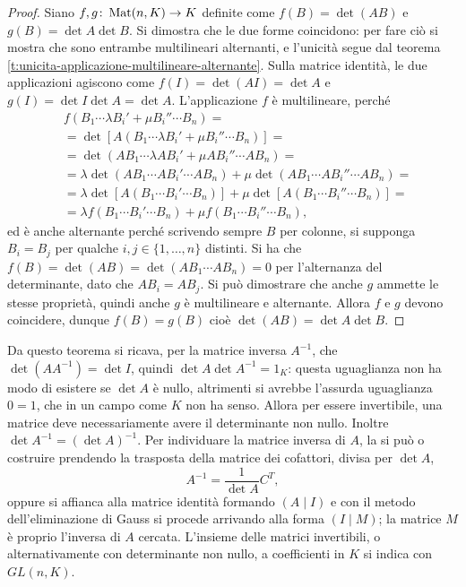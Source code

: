 \begin{proof}
	Siano $f,g\colon\operatorname{Mat}(n,K)\to K$ definite come $f(B)=\det(AB)$ e $g(B)=\det A\det B$.
	Si dimostra che le due forme coincidono: per fare ciò si mostra che sono entrambe multilineari alternanti, e l'unicità segue dal teorema \ref{t:unicita-applicazione-multilineare-alternante}.
	Sulla matrice identità, le due applicazioni agiscono come $f(I)=\det(AI)=\det A$ e $g(I)=\det I\det A=\det A$.
	L'applicazione $f$ è multilineare, perché
	\begin{align*}
		&f(B_1\cdots\lambda B_i'+\mu B_i''\cdots B_n)=\\
		&=\det[A(B_1\cdots\lambda B_i'+\mu B_i''\cdots B_n)]=\\
		&=\det(AB_1\cdots\lambda AB_i'+\mu AB_i''\cdots AB_n)=\\
		&=\lambda\det(AB_1\cdots AB_i'\cdots AB_n)+\mu\det(AB_1\cdots AB_i''\cdots AB_n)=\\
		&=\lambda\det[A(B_1\cdots B_i'\cdots B_n)]+\mu\det[A(B_1\cdots B_i''\cdots B_n)]=\\
		&=\lambda f(B_1\cdots B_i'\cdots B_n)+\mu f(B_1\cdots B_i''\cdots B_n),
	\end{align*}
	ed è anche alternante perché scrivendo sempre $B$ per colonne, si supponga $B_i=B_j$ per qualche $i,j\in\{1,\dots,n\}$ distinti.
	Si ha che $f(B)=\det(AB)=\det(AB_1\cdots AB_n)=0$ per l'alternanza del determinante, dato che $AB_i=AB_j$.
	Si può dimostrare che anche $g$ ammette le stesse proprietà, quindi anche $g$ è multilineare e alternante.
	Allora $f$ e $g$ devono coincidere, dunque $f(B)=g(B)$ cioè $\det(AB)=\det A\det B$.
\end{proof}
Da questo teorema si ricava, per la matrice inversa $A^{-1}$, che $\det(AA^{-1})=\det I$, quindi $\det A\det A^{-1}=1_K$: questa uguaglianza non ha modo di esistere se $\det A$ è nullo, altrimenti si avrebbe l'assurda uguaglianza $0=1$, che in un campo come $K$ non ha senso.
Allora per essere invertibile, una matrice deve necessariamente avere il determinante non nullo.
Inoltre $\det A^{-1}=(\det A)^{-1}$.
Per individuare la matrice inversa di $A$, la si può o costruire prendendo la trasposta della matrice dei cofattori, divisa per $\det A$,
\begin{equation*}
	A^{-1}=\frac1{\det A}C^T,
\end{equation*}
oppure si affianca alla matrice identità formando $(A\mid I)$ e con il metodo dell'eliminazione di Gauss si procede arrivando alla forma $(I\mid M)$; la matrice $M$ è proprio l'inversa di $A$ cercata.
L'insieme delle matrici invertibili, o alternativamente con determinante non nullo, a coefficienti in $K$ si indica con $GL(n,K)$.
